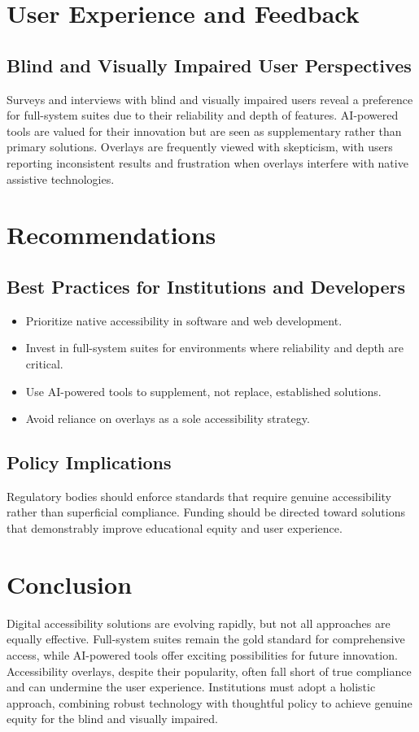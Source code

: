 \section{User Experience and Feedback}
\subsection{Blind and Visually Impaired User Perspectives}
Surveys and interviews with blind and visually impaired users reveal a preference for full-system suites due to their reliability and depth of features\supercite{Doe2020, WebAIMSurvey}. AI-powered tools are valued for their innovation but are seen as supplementary rather than primary solutions. Overlays are frequently viewed with skepticism, with users reporting inconsistent results and frustration when overlays interfere with native assistive technologies.

\section{Recommendations}
\subsection{Best Practices for Institutions and Developers}
\begin{itemize}
	\item Prioritize native accessibility in software and web development\supercite{Thatcher2006, Henry2007}.
	\item Invest in full-system suites for environments where reliability and depth are critical.
	\item Use AI-powered tools to supplement, not replace, established solutions.
	\item Avoid reliance on overlays as a sole accessibility strategy\supercite{Brown2022}.
\end{itemize}

\subsection{Policy Implications}
Regulatory bodies should enforce standards that require genuine accessibility rather than superficial compliance\supercite{Jaeger2006}. Funding should be directed toward solutions that demonstrably improve educational equity and user experience\supercite{Lazar2015}.

\section{Conclusion}
Digital accessibility solutions are evolving rapidly, but not all approaches are equally effective. Full-system suites remain the gold standard for comprehensive access, while AI-powered tools offer exciting possibilities for future innovation. Accessibility overlays, despite their popularity, often fall short of true compliance and can undermine the user experience. Institutions must adopt a holistic approach, combining robust technology with thoughtful policy to achieve genuine equity for the blind and visually impaired\supercite{Burgstahler2015}.
